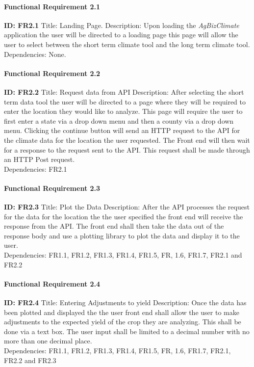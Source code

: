 \documentclass[onecolumn, draftclsnofoot,10pt, compsoc]{article}
\begin{document}
				\paragraph{Functional Requirement 2.1}
					\textbf{ID: FR2.1}\hfill \break
					Title: Landing Page.\hfill \break
					Description: Upon loading the \textit{AgBizClimate} application the user will be directed to a loading page this page will allow the user to select between the short term climate tool and the long term climate tool.\\
					Dependencies: None.\hfill \break

				\paragraph{Functional Requirement 2.2}
					\textbf{ID: FR2.2}\hfill \break
					Title: Request data from API\hfill \break
					Description: After selecting the short term data tool the user will be directed to a page where they will be required to enter the location they would like to analyze. This page will require the user to first enter a state via a drop down menu and then a county via a drop down menu. Clicking the continue button will send an HTTP request to the API for the climate data for the location the user requested. The Front end will then wait for a response to the request sent to the API. This request shall be made through an HTTP Post request.\\
					Dependencies: FR2.1\hfill \break

				\paragraph{Functional Requirement 2.3}
					\textbf{ID: FR2.3}\hfill \break
					Title: Plot the Data\hfill \break
					Description: After the API processes the request for the data for the location the the user specified the front end will receive the response from the API. The front end shall then take the data out of the response body and use a plotting library to plot the data and display it to the user.\\
					Dependencies: FR1.1, FR1.2, FR1.3, FR1.4, FR1.5, FR, 1.6, FR1.7, FR2.1 and FR2.2\hfill \break

				\paragraph{Functional Requirement 2.4}
					\textbf{ID: FR2.4}\hfill \break
					Title: Entering Adjustments to yield\hfill \break
					Description: Once the data has been plotted and displayed the the user front end shall allow the user to make adjustments to the expected yield of the crop they are analyzing. This shall be done via a text box. The user input shall be limited to a decimal number with no more than one decimal place.\\
					Dependencies: FR1.1, FR1.2, FR1.3, FR1.4, FR1.5, FR, 1.6, FR1.7, FR2.1, FR2.2 and FR2.3\hfill \break
\end{document}
